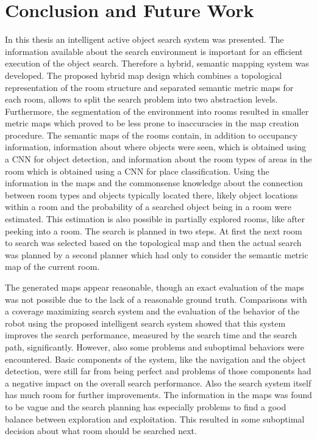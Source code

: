 \chapter{Conclusion and Future Work}

In this thesis an intelligent active object search system was presented. The information available about the search environment is important for an efficient execution of the object search. Therefore a hybrid, semantic mapping system was developed. The proposed hybrid map design which combines a topological representation of the room structure and separated semantic metric maps for each room, allows to split the search problem into two abstraction levels. Furthermore, the segmentation of the environment into rooms resulted in smaller metric maps which proved to be less prone to inaccuracies in the map creation procedure. The semantic maps of the rooms contain, in addition to occupancy information, information about where objects were seen, which is obtained using a CNN for object detection, and information about the room types of areas in the room which is obtained using a CNN for place classification. Using the information in the maps and the commonsense knowledge about the connection between room types and objects typically located there, likely object locations within a room and the probability of a searched object being in a room were estimated. This estimation is also possible in partially explored rooms, like after peeking into a room. The search is planned in two steps. At first the next room to search was selected based on the topological map and then the actual search was planned by a second planner which had only to consider the semantic metric map of the current room.

The generated maps appear reasonable, though an exact evaluation of the maps was not possible due to the lack of a reasonable ground truth. Comparisons with a coverage maximizing search system and the evaluation of the behavior of the robot using the proposed intelligent search system showed that this system improves the search performance, measured by the search time and the search path, significantly. However, also some problems and suboptimal behaviors were encountered. Basic components of the system, like the navigation and the object detection, were still far from being perfect and problems of those components had a negative impact on the overall search performance. Also the search system itself has much room for further improvements. The information in the maps was found to be vague and the search planning has especially problems to find a good balance between exploration and exploitation. This resulted in some suboptimal decision about what room should be searched next.

